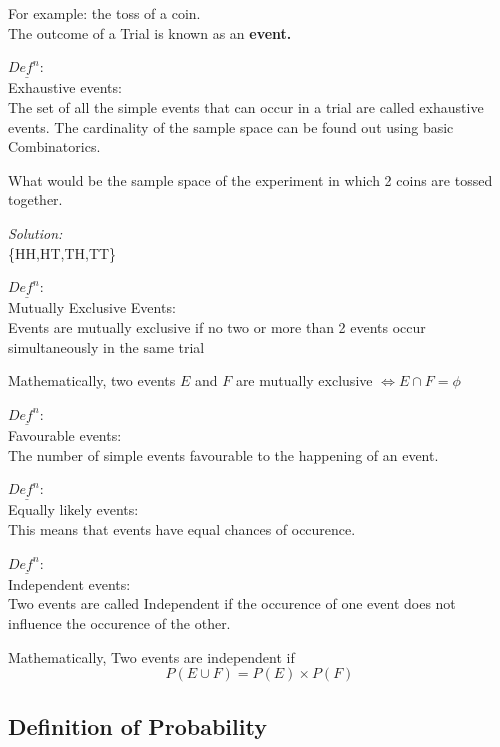 \documentclass[11pt,letterpaper]{article}
\newenvironment{problem}[2][Problem]                                  
        {\begin{tcolorbox}[colback=white,colframe=gray!50,title=#1 #2]}
        {\end{tcolorbox}}
\newenvironment{solution}                      
        {\begin{mdframed}\textit{Solution:} \\}
        {\end{mdframed}}
\newenvironment{definition}
	{\begin{mdframed}$\underline{\textit{Def}^\textit{n}:} $\\}
	{\end{mdframed}}
\begin{document}
For example: the toss of a coin.\\
The outcome of a Trial is known as an \textbf{event. }

\begin{definition}
Exhaustive events:\\
The set of all the simple events that can occur in a trial are called exhaustive events. 
The cardinality of the sample space can be found out using basic Combinatorics.
\end{definition}

\begin{problem}8
  What would be the sample space of the experiment in which 2 coins are tossed together.
\end{problem}

\begin{solution}
  \{HH,HT,TH,TT\}
\end{solution}

\begin{definition}
Mutually Exclusive Events:\\
Events are mutually exclusive if no two or more than 2 events occur simultaneously in the same trial
\end{definition}

Mathematically, two events $E$ and $F$ are mutually exclusive $\iff E \cap F = \phi$

\begin{definition}
Favourable events:\\
The number of simple events favourable to the happening of an event. 
\end{definition}

\begin{definition}
Equally likely events:\\
This means that events have equal chances of occurence.
\end{definition}

\begin{definition}
Independent events:\\
Two events are called Independent if the occurence of one event does not influence the occurence of the other. 

Mathematically, Two events are independent if
\[
  P(E \cup F) = P(E) \times P(F)
\]
\end{definition}

\subsection{Definition of Probability}
\end{document}
